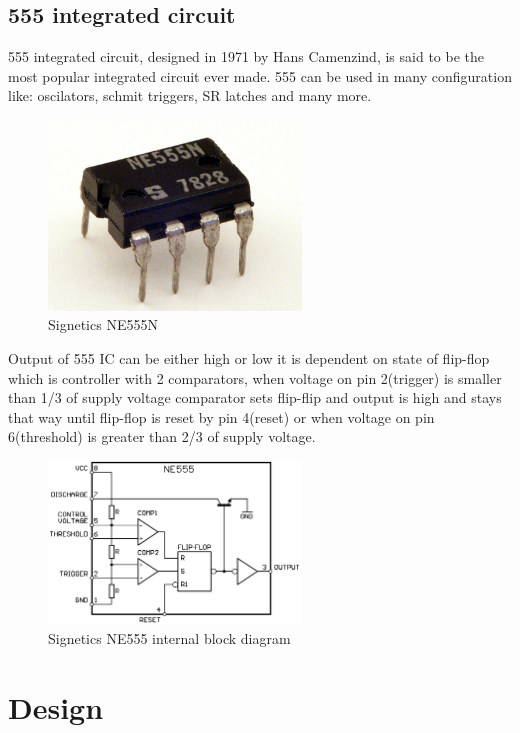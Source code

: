 \documentclass[english,10pt,a4paper]{article}
\begin{document}
	\subsection{555 integrated circuit}
	555 integrated circuit, designed in 1971 by Hans Camenzind, is said to be the most popular integrated circuit ever made. 555 can be used in many configuration like: oscilators, schmit triggers, SR latches and many more.
	
	\begin{figure}[H]
		\centering
		\includegraphics[width=0.6\textwidth]{img/Signetics_NE555N.JPG}
		\caption{Signetics NE555N}
	\end{figure}
		
	Output of 555 IC can be either high or low it is dependent on state of flip-flop which is controller with 2 comparators, when voltage on pin 2(trigger) is smaller than 1/3 of supply voltage comparator sets flip-flip and output is high and stays that way until flip-flop is reset by pin 4(reset) or when voltage on pin 6(threshold) is greater than 2/3 of supply voltage.
		
	\begin{figure}[H]
		\centering
		\includegraphics[width=0.6\textwidth]{img/555_esquema.png}
		\caption{Signetics NE555 internal block diagram}
	\end{figure}
	
	\section{Design}
\end{document}
